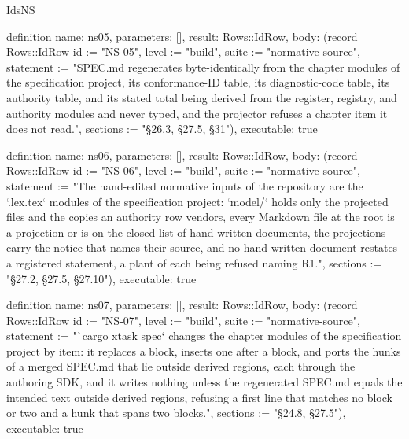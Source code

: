 \begin{lexlean}{IdsNS}
\begin{semanticmodule}
definition{
  name: ns05,
  parameters: [],
  result: Rows::IdRow,
  body: (record Rows::IdRow {id := "NS-05", level := "build", suite := "normative-source", statement := "SPEC.md regenerates byte-identically from the chapter modules of the specification project, its conformance-ID table, its diagnostic-code table, its authority table, and its stated total being derived from the register, registry, and authority modules and never typed, and the projector refuses a chapter item it does not read.", sections := "§26.3, §27.5, §31"}),
  executable: true
}

definition{
  name: ns06,
  parameters: [],
  result: Rows::IdRow,
  body: (record Rows::IdRow {id := "NS-06", level := "build", suite := "normative-source", statement := "The hand-edited normative inputs of the repository are the `.lex.tex` modules of the specification project: `model/` holds only the projected files and the copies an authority row vendors, every Markdown file at the root is a projection or is on the closed list of hand-written documents, the projections carry the notice that names their source, and no hand-written document restates a registered statement, a plant of each being refused naming R1.", sections := "§27.2, §27.5, §27.10"}),
  executable: true
}

definition{
  name: ns07,
  parameters: [],
  result: Rows::IdRow,
  body: (record Rows::IdRow {id := "NS-07", level := "build", suite := "normative-source", statement := "`cargo xtask spec` changes the chapter modules of the specification project by item: it replaces a block, inserts one after a block, and ports the hunks of a merged SPEC.md that lie outside derived regions, each through the authoring SDK, and it writes nothing unless the regenerated SPEC.md equals the intended text outside derived regions, refusing a first line that matches no block or two and a hunk that spans two blocks.", sections := "§24.8, §27.5"}),
  executable: true
}
\end{semanticmodule}
\end{lexlean}
